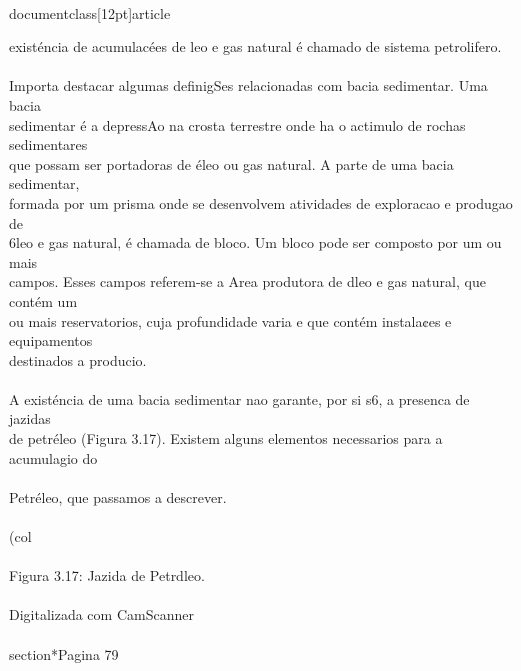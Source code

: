 \\documentclass[12pt]{article}
\begin{document}
{existéncia de acumulacées de leo e gas natural é chamado de sistema petrolifero.\\
\\
Importa destacar algumas definigSes relacionadas com bacia sedimentar. Uma bacia\\
sedimentar é a depressAo na crosta terrestre onde ha o actimulo de rochas sedimentares\\
que possam ser portadoras de éleo ou gas natural. A parte de uma bacia sedimentar,\\
formada por um prisma onde se desenvolvem atividades de exploracao e produgao de\\
6leo e gas natural, é chamada de bloco. Um bloco pode ser composto por um ou mais\\
campos. Esses campos referem-se a Area produtora de dleo e gas natural, que contém um\\
ou mais reservatorios, cuja profundidade varia e que contém instala¢es e equipamentos\\
destinados a producio.\\
\\
A existéncia de uma bacia sedimentar nao garante, por si s6, a presenca de jazidas\\
de petréleo (Figura 3.17). Existem alguns elementos necessarios para a acumulagio do\\
\\
Petréleo, que passamos a descrever.\\
\\
(col\\
\\
Figura 3.17: Jazida de Petrdleo.\\
\\
Digitalizada com CamScanner\\

\\section*{Pagina 79}

}
\end{document}
